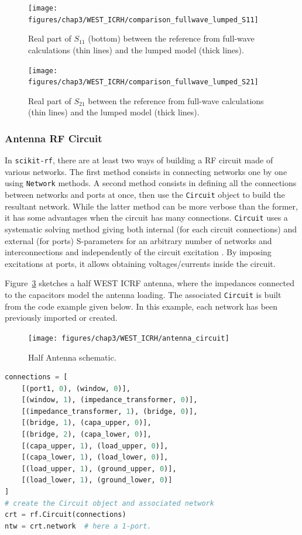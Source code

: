 {\begin{figure}
	\centering
	\texttt{[image: figures/chap3/WEST\_ICRH/comparison\_fullwave\_lumped\_S11]}
	\caption{Real part of $S_{11}$ (bottom) between the reference from full-wave  calculations (thin lines) and the lumped model (thick lines).}
	\label{fig:capacitor_interpolation_S11}
\end{figure}

\begin{figure}
	\centering
	\texttt{[image: figures/chap3/WEST\_ICRH/comparison\_fullwave\_lumped\_S21]}
	\caption{Real part of $S_{21}$ between the reference from full-wave  calculations (thin lines) and the lumped model (thick lines).}
	\label{fig:capacitor_interpolation_S21}
\end{figure}

\subsubsection{Antenna RF Circuit}
In \texttt{scikit-rf}, there are at least two ways of building a RF circuit made of various networks. The first method consists in connecting networks one by one using \texttt{Network} methods. A second method consists in defining all the connections between networks and ports at once, then use the \texttt{Circuit} object to build the resultant network. While the latter method can be more verbose than the former, it has some advantages when the circuit has many connections. \texttt{Circuit} uses a systematic solving method giving both internal (for each circuit connections) and external (for ports) S-parameters for an arbitrary number of networks and interconnections and independently of the circuit excitation . By imposing excitations at ports, it allows obtaining voltages/currents inside the circuit.

Figure~\ref{fig:antenna_circuit} sketches a half WEST ICRF antenna, where the impedances connected to the capacitors model the antenna loading. The associated \texttt{Circuit} is built from the code example given below. In this example, each network has been previously imported or created. 

\begin{figure}
	\centering
	\texttt{[image: figures/chap3/WEST\_ICRH/antenna\_circuit]}
	\caption{Half Antenna schematic.}
	\label{fig:antenna_circuit}
\end{figure}

\begin{lstlisting}[language=Python, basicstyle=\footnotesize]
connections = [
	[(port1, 0), (window, 0)],
	[(window, 1), (impedance_transformer, 0)],
	[(impedance_transformer, 1), (bridge, 0)],
	[(bridge, 1), (capa_upper, 0)],
	[(bridge, 2), (capa_lower, 0)],
	[(capa_upper, 1), (load_upper, 0)],
	[(capa_lower, 1), (load_lower, 0)],
	[(load_upper, 1), (ground_upper, 0)],
	[(load_lower, 1), (ground_lower, 0)]
]
# create the Circuit object and associated network
crt = rf.Circuit(connections) 
ntw = crt.network  # here a 1-port.			
\end{lstlisting}

}
